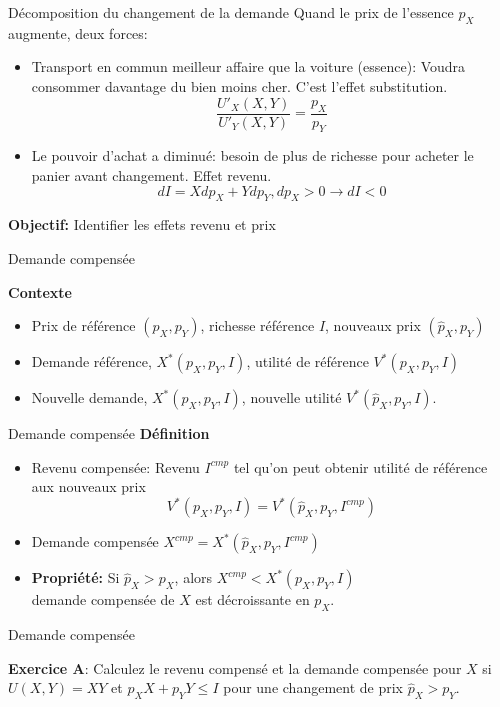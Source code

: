 \documentclass[handout]{beamer}
\newenvironment{iPar}[1]{\textbf{#1} \begin{itemize}}{\end{itemize}}
\newcommand{\cp}{{cmp}}
\begin{document}
\begin{frame}{Décomposition du changement de la demande}
Quand le prix de l'essence $p_X$ augmente, deux forces: \begin{itemize}
\item Transport en commun meilleur affaire que la voiture (essence): Voudra consommer davantage du bien moins cher. C'est l'effet substitution. $$ \frac{U'_X(X,Y)}{U'_Y(X,Y)} = \frac{p_X}{p_Y}$$

\item Le pouvoir d'achat a diminué: besoin de plus de richesse pour acheter le panier avant changement. Effet revenu. $$ dI = Xdp_X + Ydp_Y, dp_X>0 \rightarrow dI<0$$
\end{itemize}

\textbf{Objectif:} Identifier les effets revenu et prix

\end{frame}

\begin{frame}{Demande compensée}

\begin{iPar}{Contexte}
\item Prix de référence $(p_X,p_Y)$, richesse référence $I$, nouveaux prix $(\hat p_X,p_Y)$
\item Demande référence, $X^*(p_X,p_Y,I)$, utilité de référence $V^*(p_X,p_Y,I)$
\item Nouvelle demande, $X^*(\hat p_X, p_Y, I)$, nouvelle utilité $V^*(\hat p_X,p_Y,I)$.
\end{iPar}
\end{frame}

\begin{frame}{Demande compensée}
\begin{iPar}{Définition}
\item Revenu compensée: Revenu $I^\cp$ tel qu'on peut obtenir utilité de référence aux nouveaux prix $$V^*(p_X,p_Y, I) = V^*(\hat p_X, p_Y,  I^\cp)$$
\item Demande compensée $X^\cp = X^*(\hat p_X, p_Y,  I^\cp)$
\item \textbf{Propriété:}  Si $\hat p_X > p_X$, alors $X^\cp <X^*(p_X,p_Y,I)$\\ demande compensée de $X$ est décroissante en $p_X$.
\end{iPar}
\end{frame}

\begin{frame}{Demande compensée}

\textbf{Exercice A}: Calculez le revenu compensé et la demande compensée pour $X$ si $U(X,Y) = XY$ et $p_XX+p_YY \le I$ pour une changement de prix $\hat p_X > p_Y$. 

\end{frame}
\end{document}
